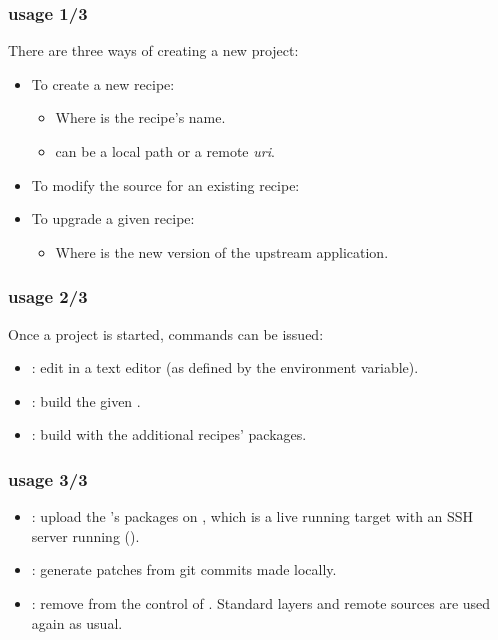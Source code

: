 \begin{frame}
  \frametitle{ usage 1/3}
  There are three ways of creating a new  project:
  \begin{itemize}
    \item To create a new recipe:
      \begin{itemize}
        \item Where  is the recipe's name.
        \item {} can be a local path or a remote {\em
          uri}.
      \end{itemize}
    \item To modify the source for an existing recipe: 
    \item To upgrade a given recipe:
      \begin{itemize}
        \item Where  is the new version of the upstream
          application.
      \end{itemize}
  \end{itemize}
\end{frame}

\begin{frame}
  \frametitle{ usage 2/3}
  Once a  project is started, commands can be issued:
  \begin{itemize}
    \item {}: edit  in a text
      editor (as defined by the  environment variable).
    \item {}: build the given
      .
    \item {}: build  with
      the additional  recipes' packages.
  \end{itemize}
\end{frame}

\begin{frame}
  \frametitle{ usage 3/3}
  \begin{itemize}
    \item {}: upload the
      's packages on , which is a live
      running target with an SSH server running ().
    \item {}: generate patches from
      git commits made locally.
    \item {}: remove  from the
      control of . Standard layers and remote sources
      are used again as usual.
  \end{itemize}
\end{frame}

